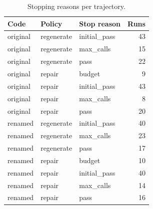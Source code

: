 \begin{table}[t]
\centering\small
\caption{Stopping reasons per trajectory.}
\label{tab:stops}
\begin{tabular}{lllr}
\toprule
Code & Policy & Stop reason & Runs \\
\midrule
original & regenerate & initial\_pass & 43 \\
original & regenerate & max\_calls & 15 \\
original & regenerate & pass & 22 \\
original & repair & budget & 9 \\
original & repair & initial\_pass & 43 \\
original & repair & max\_calls & 8 \\
original & repair & pass & 20 \\
renamed & regenerate & initial\_pass & 40 \\
renamed & regenerate & max\_calls & 23 \\
renamed & regenerate & pass & 17 \\
renamed & repair & budget & 10 \\
renamed & repair & initial\_pass & 40 \\
renamed & repair & max\_calls & 14 \\
renamed & repair & pass & 16 \\
\bottomrule
\end{tabular}
\end{table}
